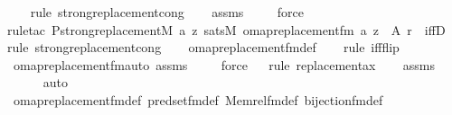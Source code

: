 \begin{isabellebody}
\ \ \ \isamarkupfalse%
{\isacharparenleft}{\kern0pt}rule\ strong{\isacharunderscore}{\kern0pt}replacement{\isacharunderscore}{\kern0pt}cong{\isacharparenright}{\kern0pt}\isanewline
\ \ \isamarkupfalse%
\ assms\isanewline
\ \ \ \isamarkupfalse%
\ force\isanewline
\ \ \isamarkupfalse%
{\isacharparenleft}{\kern0pt}rule{\isacharunderscore}{\kern0pt}tac\ P{\isacharequal}{\kern0pt}{\isachardoublequoteopen}strong{\isacharunderscore}{\kern0pt}replacement{\isacharparenleft}{\kern0pt}{\isacharhash}{\kern0pt}{\isacharhash}{\kern0pt}M{\isacharcomma}{\kern0pt}\ {\isasymlambda}a\ z{\isachardot}{\kern0pt}\ sats{\isacharparenleft}{\kern0pt}M{\isacharcomma}{\kern0pt}\ omap{\isacharunderscore}{\kern0pt}replacement{\isacharunderscore}{\kern0pt}fm{\isacharcomma}{\kern0pt}\ {\isacharbrackleft}{\kern0pt}a{\isacharcomma}{\kern0pt}\ z{\isacharbrackright}{\kern0pt}\ {\isacharat}{\kern0pt}\ {\isacharbrackleft}{\kern0pt}A{\isacharcomma}{\kern0pt}\ r{\isacharbrackright}{\kern0pt}{\isacharparenright}{\kern0pt}{\isacharparenright}{\kern0pt}{\isachardoublequoteclose}\ \ iffD{}{\isacharparenright}{\kern0pt}\isanewline
\ \ \isamarkupfalse%
{\isacharparenleft}{\kern0pt}rule\ strong{\isacharunderscore}{\kern0pt}replacement{\isacharunderscore}{\kern0pt}cong{\isacharparenright}{\kern0pt}\isanewline
\ \ \isamarkupfalse%
\ omap{\isacharunderscore}{\kern0pt}replacement{\isacharunderscore}{\kern0pt}fm{\isacharunderscore}{\kern0pt}def\isanewline
\ \ \ \isamarkupfalse%
{\isacharparenleft}{\kern0pt}rule\ iff{\isacharunderscore}{\kern0pt}flip{\isacharparenright}{\kern0pt}\isanewline
\ \ \isamarkupfalse%
\ omap{\isacharunderscore}{\kern0pt}replacement{\isacharunderscore}{\kern0pt}fm{\isacharunderscore}{\kern0pt}auto\ assms\isanewline
\ \ \ \isamarkupfalse%
\ force\isanewline
\ \ \isamarkupfalse%
{\isacharparenleft}{\kern0pt}rule\ replacement{\isacharunderscore}{\kern0pt}ax{\isacharparenright}{\kern0pt}\isanewline
\ \ \isamarkupfalse%
\ assms\isanewline
\ \ \ \ \isamarkupfalse%
\ auto{\isacharbrackleft}{\kern0pt}{}{\isacharbrackright}{\kern0pt}\isanewline
\ \ \isamarkupfalse%
\ omap{\isacharunderscore}{\kern0pt}replacement{\isacharunderscore}{\kern0pt}fm{\isacharunderscore}{\kern0pt}def\ pred{\isacharunderscore}{\kern0pt}set{\isacharunderscore}{\kern0pt}fm{\isacharunderscore}{\kern0pt}def\ Memrel{\isacharunderscore}{\kern0pt}fm{\isacharunderscore}{\kern0pt}def\ bijection{\isacharunderscore}{\kern0pt}fm{\isacharunderscore}{\kern0pt}def\isanewline

\end{isabellebody}
